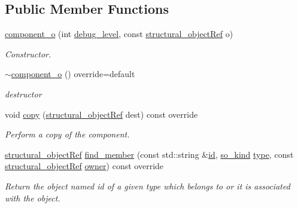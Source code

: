 \subsection*{Public Member Functions}
\begin{DoxyCompactItemize}
\item 
\hyperlink{classcomponent__o_a2469a8ddc89996074cd2fcbef9e59838}{component\+\_\+o} (int \hyperlink{classstructural__object_ac2744292aa7f0fca3742133d16bb3201}{debug\+\_\+level}, const \hyperlink{structural__objects_8hpp_a8ea5f8cc50ab8f4c31e2751074ff60b2}{structural\+\_\+object\+Ref} o)
\begin{DoxyCompactList}\small\item\em Constructor. \end{DoxyCompactList}\item 
\hyperlink{classcomponent__o_aa7c9521caef05636ad1b4d5656135b58}{$\sim$component\+\_\+o} () override=default
\begin{DoxyCompactList}\small\item\em destructor \end{DoxyCompactList}\item 
void \hyperlink{classcomponent__o_abdd94a898eec3592371908dbe9ade6b4}{copy} (\hyperlink{structural__objects_8hpp_a8ea5f8cc50ab8f4c31e2751074ff60b2}{structural\+\_\+object\+Ref} dest) const override
\begin{DoxyCompactList}\small\item\em Perform a copy of the component. \end{DoxyCompactList}\item 
\hyperlink{structural__objects_8hpp_a8ea5f8cc50ab8f4c31e2751074ff60b2}{structural\+\_\+object\+Ref} \hyperlink{classcomponent__o_a266d073fa06ab5799ec890d092552b00}{find\+\_\+member} (const std\+::string \&\hyperlink{classstructural__object_a841a75f6e349ff7c1987dc92d4ac33a6}{id}, \hyperlink{structural__objects_8hpp_acf52399aecacb7952e414c5746ce6439}{so\+\_\+kind} \hyperlink{classstructural__object_a9a7159ce4c8da9984f256d9032f49778}{type}, const \hyperlink{structural__objects_8hpp_a8ea5f8cc50ab8f4c31e2751074ff60b2}{structural\+\_\+object\+Ref} \hyperlink{classstructural__object_a3e96b3e00b8a78adfc44872d82e186ea}{owner}) const override
\begin{DoxyCompactList}\small\item\em Return the object named id of a given type which belongs to or it is associated with the object. \end{DoxyCompactList}\item 

\end{DoxyCompactItemize}
